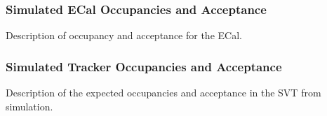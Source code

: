 
\subsubsection{Simulated ECal Occupancies and Acceptance}
Description of occupancy and acceptance for the ECal.

\subsubsection{Simulated Tracker Occupancies and Acceptance}
Description of the expected occupancies and acceptance in the SVT from simulation.


